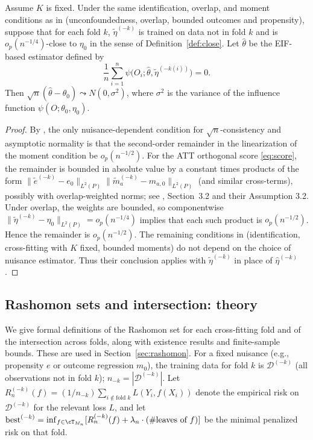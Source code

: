 \documentclass[12pt]{article}
\begin{document}
\begin{theorem}
\label{thm:dml-alt}
Assume $K$ is fixed. Under the same identification, overlap, and moment conditions as in \citet{chernozhukov2018} (unconfoundedness, overlap, bounded outcomes and propensity), suppose that for each fold $k$, $\tilde{\eta}^{(-k)}$ is trained on data not in fold $k$ and is $o_p(n^{-1/4})$-close to $\eta_0$ in the sense of Definition~\ref{def:close}. Let $\hat\theta$ be the EIF-based estimator defined by
\[
\frac{1}{n} \sum_{i=1}^n \psi\bigl(O_i; \hat\theta, \tilde{\eta}^{(-k(i))}\bigr) = 0.
\]
Then $\sqrt{n}(\hat\theta - \theta_0) \leadsto N(0, \sigma^2)$, where $\sigma^2$ is the variance of the influence function $\psi(O; \theta_0, \eta_0)$.
\end{theorem}
\begin{proof}
By \citet{chernozhukov2018}, the only nuisance-dependent condition for $\sqrt{n}$-consistency and asymptotic normality is that the second-order remainder in the linearization of the moment condition be $o_p(n^{-1/2})$. For the ATT orthogonal score \eqref{eq:score}, the remainder is bounded in absolute value by a constant times products of the form $\|\tilde{e}^{(-k)} - e_0\|_{L^2(P)} \|\tilde{m}_a^{(-k)} - m_{a,0}\|_{L^2(P)}$ (and similar cross-terms), possibly with overlap-weighted norms; see \citet{chernozhukov2018}, Section~3.2 and their Assumption 3.2. Under overlap, the weights are bounded, so componentwise $\|\tilde{\eta}^{(-k)} - \eta_0\|_{L^2(P)} = o_p(n^{-1/4})$ implies that each such product is $o_p(n^{-1/2})$. Hence the remainder is $o_p(n^{-1/2})$. The remaining conditions in \citet{chernozhukov2018} (identification, cross-fitting with $K$ fixed, bounded moments) do not depend on the choice of nuisance estimator. Thus their conclusion applies with $\tilde{\eta}^{(-k)}$ in place of $\hat\eta^{(-k)}$.
\end{proof}

\subsection{Rashomon sets and intersection: theory}
\label{app:rashomon}

We give formal definitions of the Rashomon set for each cross-fitting fold and of the intersection across folds, along with existence results and finite-sample bounds. These are used in Section~\ref{sec:rashomon}. For a fixed nuisance (e.g., propensity $e$ or outcome regression $m_0$), the training data for fold $k$ is $\mathcal{D}^{(-k)}$ (all observations not in fold $k$); $n_{-k} = |\mathcal{D}^{(-k)}|$. Let $R_n^{(-k)}(f) = (1/n_{-k}) \sum_{i \notin \text{fold } k} L(Y_i, f(X_i))$ denote the empirical risk on $\mathcal{D}^{(-k)}$ for the relevant loss $L$, and let $\text{best}^{(-k)} = \inf_{f \in \cT_{M_n}} [ R_n^{(-k)}(f) + \lambda_n \cdot (\#\text{leaves of } f) ]$ be the minimal penalized risk on that fold.
\end{document}
